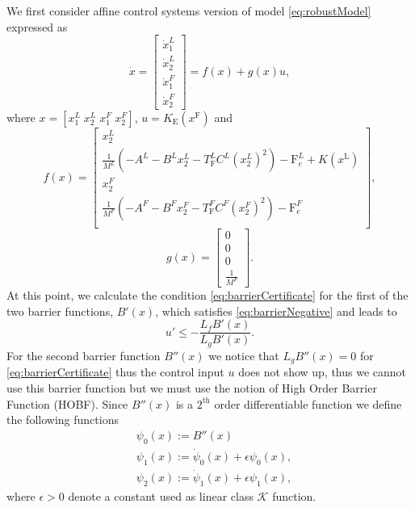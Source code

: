 We first consider affine control systems version of model \ref{eq:robustModel} expressed as
%
\begin{equation} \label{eq:affine}
	\dot{x} =  \begin{bmatrix}
		\dot{x}^L_{1} \\
		\dot{x}^L_{2} \\
		\dot{x}^F_{1} \\
		\dot{x}^F_{2}
	\end{bmatrix} = f(x) + g(x)u,
\end{equation}
%
where $x= \left[x_1^L \; x_2^L \; x_1^F \; x_2^F\right]$, $u=K_{\mathrm{E}}\left({x}^{\mathrm{F}}\right)$ and
\begin{equation}
	f(x) = \begin{bmatrix}
		x^L_{2} \\
		\frac{1}{M^L}(-A^L-B^L x_2^L - T_\mathrm{F}^L C^L (x_2^L)^2)-\mathrm{F}_e^L +K\left({x}^{\mathrm{L}} \right) \\
		x^F_{2} \\
		\frac{1}{M^F}(-A^F-B^F x_2^F - T_\mathrm{F}^F C^F (x_2^F)^2)-\mathrm{F}_e^F \\
	\end{bmatrix},
\end{equation}
\begin{equation}
	g(x) = \begin{bmatrix}
		0 \\
		0 \\
		0 \\
		\frac{1}{M^F}
	\end{bmatrix}.
\end{equation}
At this point, we calculate the condition \eqref{eq:barrierCertificate} for the  first  of the two barrier functions, $B'(x)$, which satisfies \eqref{eq:barrierNegative} and leads to
%
\begin{equation}
	u' \leq -\frac{L_f B'(x)}{L_g B'(x)}.
\end{equation}
%
For the second barrier function $B''(x)$ we notice that $L_g B''(x) = 0$ for \eqref{eq:barrierCertificate} thus the control input
$u$ does not show up, thus we cannot use this
barrier function but we must use the notion of High Order Barrier Function (HOBF). Since $B''(x)$ is a $2^{\text{th}}$ order differentiable
function we define the following functions
%
\begin{equation} \label{eq:psi}
	\begin{aligned}
		& \psi_0(x):=B''(x) \\
		& \psi_1(x):=\dot{\psi}_0(x)+\epsilon \psi_0(x), \\
		& \psi_2(x):=\dot{\psi}_1(x)+\epsilon \psi_1(x),
	\end{aligned}
\end{equation}
%
where $\epsilon > 0$ denote a constant used as linear class $\mathcal{K}$ function.

